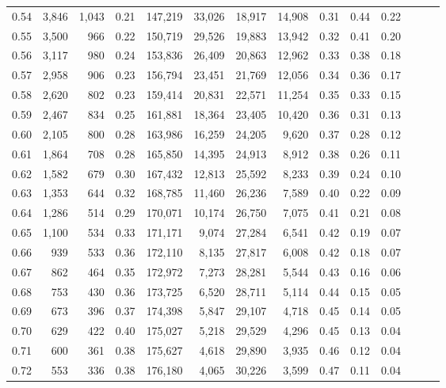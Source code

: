 \begin{tabular}{rrrrrrrrrrrrrr}
0.54 &  3,846 &  1,043 &  0.21 &  147,219 &   33,026 &  18,917 &  14,908 &  0.31 &  0.44 &      0.22 \\
0.55 &  3,500 &    966 &  0.22 &  150,719 &   29,526 &  19,883 &  13,942 &  0.32 &  0.41 &      0.20 \\
0.56 &  3,117 &    980 &  0.24 &  153,836 &   26,409 &  20,863 &  12,962 &  0.33 &  0.38 &      0.18 \\
0.57 &  2,958 &    906 &  0.23 &  156,794 &   23,451 &  21,769 &  12,056 &  0.34 &  0.36 &      0.17 \\
0.58 &  2,620 &    802 &  0.23 &  159,414 &   20,831 &  22,571 &  11,254 &  0.35 &  0.33 &      0.15 \\
0.59 &  2,467 &    834 &  0.25 &  161,881 &   18,364 &  23,405 &  10,420 &  0.36 &  0.31 &      0.13 \\
0.60 &  2,105 &    800 &  0.28 &  163,986 &   16,259 &  24,205 &   9,620 &  0.37 &  0.28 &      0.12 \\
0.61 &  1,864 &    708 &  0.28 &  165,850 &   14,395 &  24,913 &   8,912 &  0.38 &  0.26 &      0.11 \\
0.62 &  1,582 &    679 &  0.30 &  167,432 &   12,813 &  25,592 &   8,233 &  0.39 &  0.24 &      0.10 \\
0.63 &  1,353 &    644 &  0.32 &  168,785 &   11,460 &  26,236 &   7,589 &  0.40 &  0.22 &      0.09 \\
0.64 &  1,286 &    514 &  0.29 &  170,071 &   10,174 &  26,750 &   7,075 &  0.41 &  0.21 &      0.08 \\
0.65 &  1,100 &    534 &  0.33 &  171,171 &    9,074 &  27,284 &   6,541 &  0.42 &  0.19 &      0.07 \\
0.66 &    939 &    533 &  0.36 &  172,110 &    8,135 &  27,817 &   6,008 &  0.42 &  0.18 &      0.07 \\
0.67 &    862 &    464 &  0.35 &  172,972 &    7,273 &  28,281 &   5,544 &  0.43 &  0.16 &      0.06 \\
0.68 &    753 &    430 &  0.36 &  173,725 &    6,520 &  28,711 &   5,114 &  0.44 &  0.15 &      0.05 \\
0.69 &    673 &    396 &  0.37 &  174,398 &    5,847 &  29,107 &   4,718 &  0.45 &  0.14 &      0.05 \\
0.70 &    629 &    422 &  0.40 &  175,027 &    5,218 &  29,529 &   4,296 &  0.45 &  0.13 &      0.04 \\
0.71 &    600 &    361 &  0.38 &  175,627 &    4,618 &  29,890 &   3,935 &  0.46 &  0.12 &      0.04 \\
0.72 &    553 &    336 &  0.38 &  176,180 &    4,065 &  30,226 &   3,599 &  0.47 &  0.11 &      0.04 \\

\end{tabular}
